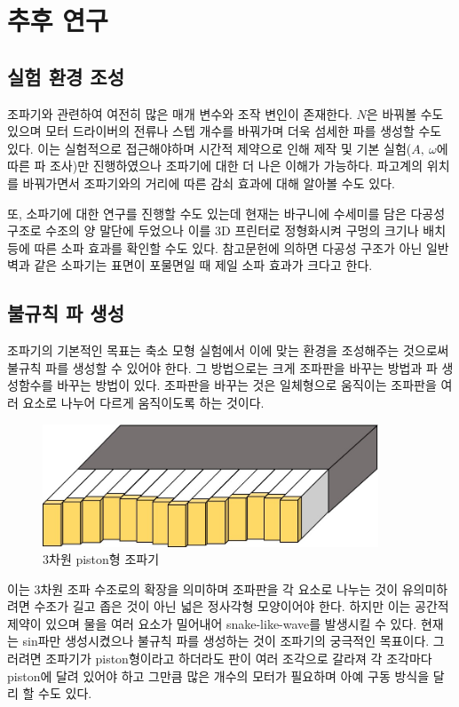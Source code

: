 \section{추후 연구}

\subsection{실험 환경 조성}
조파기와 관련하여 여전히 많은 매개 변수와 조작 변인이 존재한다. $N$은 바꿔볼 수도 있으며 모터 드라이버의 전류나 스텝 개수를 바꿔가며 더욱 섬세한 파를 생성할 수도 있다. 이는 실험적으로 접근해야하며 시간적 제약으로 인해 제작 및 기본 실험($A,~\omega$에 따른 파 조사)만 진행하였으나 조파기에 대한 더 나은 이해가 가능하다. 파고계의 위치를 바꿔가면서 조파기와의 거리에 따른 감쇠 효과에 대해 알아볼 수도 있다.

또, 소파기에 대한 연구를 진행할 수도 있는데 현재는 바구니에 수세미를 담은 다공성 구조로 수조의 양 말단에 두었으나 이를 3D 프린터로 정형화시켜 구멍의 크기나 배치 등에 따른 소파 효과를 확인할 수도 있다. 참고문헌에 의하면 다공성 구조가 아닌 일반 벽과 같은 소파기는 표면이 포물면일 때 제일 소파 효과가 크다고 한다.



\subsection{불규칙 파 생성}
조파기의 기본적인 목표는 축소 모형 실험에서 이에 맞는 환경을 조성해주는 것으로써 불규칙 파를 생성할 수 있어야 한다. 그 방법으로는 크게 조파판을 바꾸는 방법과 파 생성함수를 바꾸는 방법이 있다. 조파판을 바꾸는 것은 일체형으로 움직이는 조파판을 여러 요소로 나누어 다르게 움직이도록 하는 것이다.

\begin{figure}[htbp]
    \centering
    \includegraphics[width=10cm]{images/Wave_Maker(Snake).jpg}
    \caption{3차원 piston형 조파기}
    \label{Snake Wave Maker}
\end{figure}

이는 3차원 조파 수조로의 확장을 의미하며 조파판을 각 요소로 나누는 것이 유의미하려면 수조가 길고 좁은 것이 아닌 넓은 정사각형 모양이어야 한다. 하지만 이는 공간적 제약이 있으며 물을 여러 요소가 밀어내어 snake-like-wave를 발생시킬 수 있다. 현재는 sin파만 생성시켰으나 불규칙 파를 생성하는 것이 조파기의 궁극적인 목표이다. 그러려면 조파기가 piston형이라고 하더라도 판이 여러 조각으로 갈라져 각 조각마다 piston에 달려 있어야 하고 그만큼 많은 개수의 모터가 필요하며 아예 구동 방식을 달리 할 수도 있다.